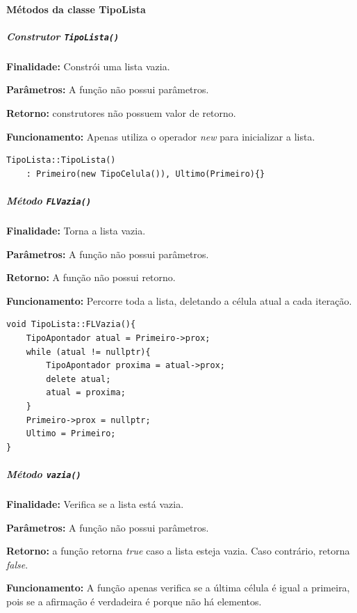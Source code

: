 \documentclass{article}
\begin{document}
\paragraph*{Métodos da classe TipoLista}
\subparagraph{Construtor \texttt{TipoLista()}}

    \mbox{}\par
    \noindent
    \textbf{Finalidade:} Constrói uma lista vazia.

    \textbf{Parâmetros:} A função não possui parâmetros.

    \textbf{Retorno:} construtores não possuem valor de retorno.

    \textbf{Funcionamento:} Apenas utiliza o operador \textit{new} para inicializar a lista.

\begin{verbatim}
TipoLista::TipoLista()
    : Primeiro(new TipoCelula()), Ultimo(Primeiro){}
\end{verbatim}

\subparagraph{Método \texttt{FLVazia()}}

    \mbox{}\par
    \noindent
    \textbf{Finalidade:} Torna a lista vazia.

    \textbf{Parâmetros:} A função não possui parâmetros.

    \textbf{Retorno:} A função não possui retorno.

    \textbf{Funcionamento:} Percorre toda a lista, deletando a célula atual a cada iteração. 

\begin{verbatim}
void TipoLista::FLVazia(){
    TipoApontador atual = Primeiro->prox;
    while (atual != nullptr){
        TipoApontador proxima = atual->prox;
        delete atual;
        atual = proxima;
    }
    Primeiro->prox = nullptr;
    Ultimo = Primeiro;
}
\end{verbatim}

\subparagraph{Método \texttt{vazia()}}

    \mbox{}\par
    \noindent
    \textbf{Finalidade:} Verifica se a lista está vazia.

    \textbf{Parâmetros:} A função não possui parâmetros.

    \textbf{Retorno:} a função retorna \textit{true} caso a lista esteja vazia. Caso contrário, retorna \textit{false}.

    \textbf{Funcionamento:} A função apenas verifica se a última célula é igual a primeira, pois se a afirmação é verdadeira é porque não há elementos.
\end{document}
